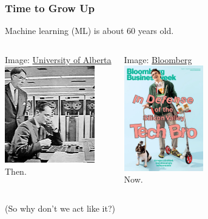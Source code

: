 \documentclass[11pt,
               aspectratio=169,
               hyperref={colorlinks}
               ]{beamer}
\begin{document}
	\begin{frame}[t]
		
		\frametitle{Time to Grow Up}
		
		\centering

		Machine learning (ML) is about 60 years old.
		\vspace{10pt}
		
		\begin{columns}
				
			\centering
			\tiny{Image: \href{https://webdocs.cs.ualberta.ca/~chinook/project/legacy.html}{University of Alberta}}\\
			\includegraphics[height=120pt]{img/samuel_sm.jpeg}\\	
			\normalsize{Then.}			
				
			\centering
			\tiny{Image: \href{https://www.bloomberg.com/news/articles/2014-08-07/silicon-valley-tech-entrepreneurs-behind-the-stereotype}{Bloomberg}}\\
			\includegraphics[height=130pt]{img/bi_tech_bro.jpeg}\\
			\normalsize{Now.}
		
		\end{columns}
		
		(So why don't we act like it?)
		
		
	\end{frame}
	
	
\end{document}
